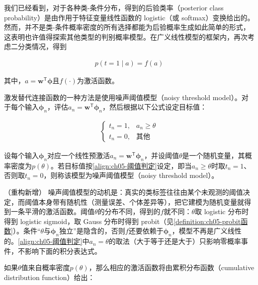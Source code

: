 \documentclass[../../main.tex]{subfiles}
\begin{document}
我们已经看到，对于各种类-条件分布，得到的后验类率（posterior class probability）是由作用于特征变量线性函数的 logistic（或 softmax）变换给出的。然而，并不是类-条件概率密度的所有选择都能为后验概率生成如此简单的形式，这表明也许值得探索其他类型的判别概率模型。在广义线性模型的框架内，再次考虑二分类情况，得到

\begin{align}
  p(t=1\mid a)=f(a)
  \label{align:ch05-阈值模型}
\end{align}

其中，$a=\boldsymbol{w}^{\mathsf{T}}\boldsymbol{\phi}$且$f(\cdot)$为激活函数。

激发替代连接函数的一种方法是使用噪声阈值模型（noisy threshold model）。对于每个输入$\boldsymbol{\phi}_n$，评估$a_n=\boldsymbol{w}^{\mathsf{T}}\boldsymbol{\phi}_n$，然后根据以下公式设定目标值：

\begin{align}
  \begin{cases}
    t_n=1, & a_n\geqslant\theta\\
    t_n=0, & \text{其他}
  \end{cases}
  \label{align:ch05-阈值判定}
\end{align}

\begin{definition}[噪声阈值模型]\label{definition:ch05-噪声阈值模型}
设每个输入$\boldsymbol{\phi}_n$对应一个线性预激活$a_n=\boldsymbol{w}^{\mathsf{T}}\boldsymbol{\phi}_n$，并设阈值$\theta$是一个随机变量，其概率密度为$p(\theta)$。若目标值按\eqref{align:ch05-阈值判定}设定，即当$a_n\geqslant\theta$时取$t_n=1$、否则取$t_n=0$，则称该模型为噪声阈值模型（noisy threshold model）。
\end{definition}

\begin{remark}（重构新增）
噪声阈值模型的动机是：真实的类标签往往由某个未观测的阈值决定，而阈值本身带有随机性（测量误差、个体差异等），把它建模为随机变量就得到一条平滑的激活函数。阈值$\theta$的分布不同，得到的$f$就不同：$\theta$取 logistic 分布时得到 logistic sigmoid，取 Gauss 分布时得到 probit（见\cref{definition:ch05-probit函数}）。条件“$\theta$与$\boldsymbol{\phi}_n$独立”是隐含的，否则$f$还要依赖于$\boldsymbol{\phi}_n$，模型不再是广义线性的。\eqref{align:ch05-阈值判定}中$a_n=\theta$的取法（大于等于还是大于）只影响零概率事件，不影响下面的积分表达式。
\end{remark}

如果$\theta$值来自概率密度$p(\theta)$，那么相应的激活函数将由累积分布函数（cumulative distribution function）给出：
\end{document}
